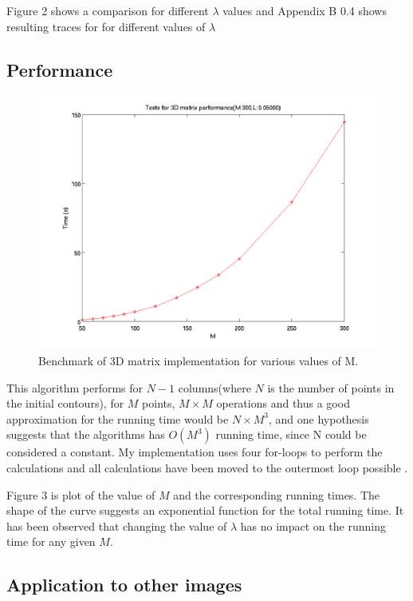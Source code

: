 \documentclass[12pt,onecolumn,a4paper]{report}
\begin{document}
Figure 2 shows a comparison for different $\lambda$ values and Appendix B 0.4 shows resulting traces for for different values of $\lambda$


\subsection{Performance}

\begin{figure}[Htb]
\includegraphics[scale=0.5]{3D/cw_3d_benchmark.png}
\centering
\caption{Benchmark of 3D matrix implementation for various values of M.}
\end{figure}

This algorithm performs for $N-1$ columns(where $N$ is the number of points in the initial contours), for $M$ points, $M\times M$ operations and thus a good approximation for the running time would be $N\times M^3$, and one hypothesis suggests that the algorithms has $O(M^3)$ running time, since N could be considered a constant. My implementation uses four {\pica for}-loops to perform the calculations and all calculations have been moved to the outermost loop possible .

Figure 3 is plot of the value of $M$ and the corresponding running times. The shape of the curve suggests an exponential function for the total running time. It has been observed that changing the value of $\lambda$ has no impact on the running time for any given $M$.

\subsection{Application to other images}
\end{document}
